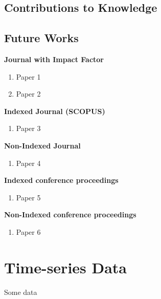 \documentclass[oneside]{utmthesis}
\begin{document}
\section{Contributions to Knowledge}
\section{Future Works}

%



\listofpublications

\noindent \textbf{Journal with Impact Factor}
\begin{enumerate}
\item Paper 1
\item Paper 2
\end{enumerate}
\textbf{Indexed Journal (SCOPUS)}
\begin{enumerate}
\item Paper 3
\end{enumerate}
\noindent \textbf{Non-Indexed Journal}
\begin{enumerate}
\item Paper 4
\end{enumerate}
\noindent \textbf{Indexed conference proceedings}
\begin{enumerate}
\item Paper 5
\end{enumerate}
\noindent \textbf{Non-Indexed conference proceedings}
\begin{enumerate}
\item Paper 6
\end{enumerate}


\appendix
\chapter{Time-series Data}
Some data

\endmatter
\end{document}
